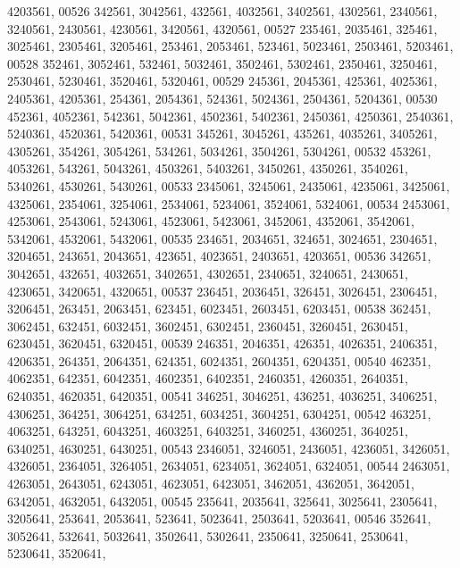 \begin{DoxyCode}
      4203561,
00526        342561, 3042561,  432561, 4032561, 3402561, 4302561, 2340561, 3240561, 2430561, 4230561, 3420561, 
      4320561,
00527        235461, 2035461,  325461, 3025461, 2305461, 3205461,  253461, 2053461,  523461, 5023461, 2503461, 
      5203461,
00528        352461, 3052461,  532461, 5032461, 3502461, 5302461, 2350461, 3250461, 2530461, 5230461, 3520461, 
      5320461,
00529        245361, 2045361,  425361, 4025361, 2405361, 4205361,  254361, 2054361,  524361, 5024361, 2504361, 
      5204361,
00530        452361, 4052361,  542361, 5042361, 4502361, 5402361, 2450361, 4250361, 2540361, 5240361, 4520361, 
      5420361,
00531        345261, 3045261,  435261, 4035261, 3405261, 4305261,  354261, 3054261,  534261, 5034261, 3504261, 
      5304261,
00532        453261, 4053261,  543261, 5043261, 4503261, 5403261, 3450261, 4350261, 3540261, 5340261, 4530261, 
      5430261,
00533       2345061, 3245061, 2435061, 4235061, 3425061, 4325061, 2354061, 3254061, 2534061, 5234061, 3524061, 
      5324061,
00534       2453061, 4253061, 2543061, 5243061, 4523061, 5423061, 3452061, 4352061, 3542061, 5342061, 4532061, 
      5432061,
00535        234651, 2034651,  324651, 3024651, 2304651, 3204651,  243651, 2043651,  423651, 4023651, 2403651, 
      4203651,
00536        342651, 3042651,  432651, 4032651, 3402651, 4302651, 2340651, 3240651, 2430651, 4230651, 3420651, 
      4320651,
00537        236451, 2036451,  326451, 3026451, 2306451, 3206451,  263451, 2063451,  623451, 6023451, 2603451, 
      6203451,
00538        362451, 3062451,  632451, 6032451, 3602451, 6302451, 2360451, 3260451, 2630451, 6230451, 3620451, 
      6320451,
00539        246351, 2046351,  426351, 4026351, 2406351, 4206351,  264351, 2064351,  624351, 6024351, 2604351, 
      6204351,
00540        462351, 4062351,  642351, 6042351, 4602351, 6402351, 2460351, 4260351, 2640351, 6240351, 4620351, 
      6420351,
00541        346251, 3046251,  436251, 4036251, 3406251, 4306251,  364251, 3064251,  634251, 6034251, 3604251, 
      6304251,
00542        463251, 4063251,  643251, 6043251, 4603251, 6403251, 3460251, 4360251, 3640251, 6340251, 4630251, 
      6430251,
00543       2346051, 3246051, 2436051, 4236051, 3426051, 4326051, 2364051, 3264051, 2634051, 6234051, 3624051, 
      6324051,
00544       2463051, 4263051, 2643051, 6243051, 4623051, 6423051, 3462051, 4362051, 3642051, 6342051, 4632051, 
      6432051,
00545        235641, 2035641,  325641, 3025641, 2305641, 3205641,  253641, 2053641,  523641, 5023641, 2503641, 
      5203641,
00546        352641, 3052641,  532641, 5032641, 3502641, 5302641, 2350641, 3250641, 2530641, 5230641, 3520641, 

\end{DoxyCode}
